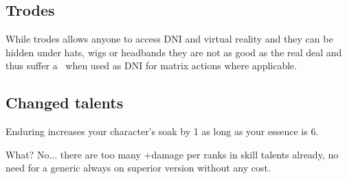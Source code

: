 \documentclass{book}
\begin{document}
\begin{multicols}{2}
\subsection{Trodes}
While trodes allows anyone to access DNI and virtual reality and they can be hidden under hats, wigs or headbands they are not as good as the real deal and thus suffer a \SetbackDie\ when used as DNI for matrix actions where applicable.

\subsection{Changed talents}

 Enduring increases your character's soak by 1 as long as your essence is 6.

 What? No... there are too many +damage per ranks in skill talents already, no need for a generic always on superior version without any cost.


\end{multicols}
	
\end{document}
